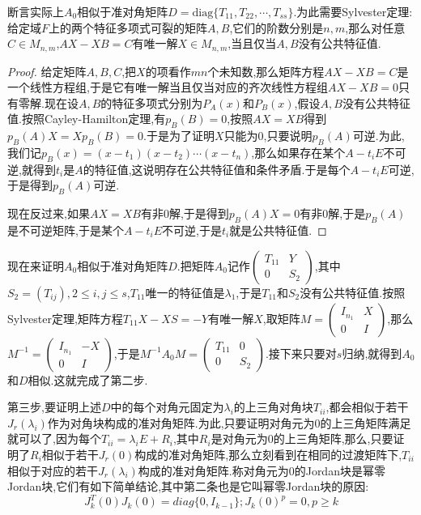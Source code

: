 断言实际上$A_0$相似于准对角矩阵$D=\mathrm{diag}\{T_{11},T_{22},\cdots,T_{ss}\}$.为此需要Sylvester定理:给定域$F$上的两个特征多项式可裂的矩阵$A,B$,它们的阶数分别是$n,m$,那么对任意$C\in M_{n,m}$,$AX-XB=C$有唯一解$X\in M_{n,m}$,当且仅当$A,B$没有公共特征值.

\begin{proof}
	
	给定矩阵$A,B,C$,把$X$的项看作$mn$个未知数,那么矩阵方程$AX-XB=C$是一个线性方程组,于是它有唯一解当且仅当对应的齐次线性方程组$AX-XB=0$只有零解.现在设$A,B$的特征多项式分别为$P_A(x)$和$P_B(x)$,假设$A,B$没有公共特征值.按照Cayley-Hamilton定理,有$p_B(B)=0$,按照$AX=XB$得到$p_B(A)X=Xp_B(B)=0$.于是为了证明$X$只能为0,只要说明$p_B(A)$可逆.为此,我们记$p_B(x)=(x-t_1)(x-t_2)\cdots(x-t_n)$,那么如果存在某个$A-t_iE$不可逆,就得到$t_i$是$A$的特征值,这说明存在公共特征值和条件矛盾.于是每个$A-t_iE$可逆,于是得到$p_B(A)$可逆.
	
	现在反过来,如果$AX=XB$有非0解,于是得到$p_B(A)X=0$有非0解,于是$p_B(A)$是不可逆矩阵,于是某个$A-t_iE$不可逆,于是$t_i$就是公共特征值.
	
\end{proof}

现在来证明$A_0$相似于准对角矩阵$D$.把矩阵$A_0$记作$\left(\begin{array}{cc}
T_{11}&Y\\
0&S_2\end{array}\right)$,其中$S_2=(T_{ij}),2\le i,j\le s$,$T_{11}$唯一的特征值是$\lambda_1$,于是$T_{11}$和$S_2$没有公共特征值.按照Sylvester定理,矩阵方程$T_{11}X-XS=-Y$有唯一解$X$,取矩阵$M=\left(\begin{array}{cc}
I_{n_1}&X\\
0&I\end{array}\right)$,那么$M^{-1}=\left(\begin{array}{cc}
I_{n_1}&-X\\
0&I\end{array}\right)$,于是$M^{-1}A_0M=\left(\begin{array}{cc}
T_{11}&0\\
0&S_2\end{array}\right)$.接下来只要对$s$归纳,就得到$A_0$和$D$相似.这就完成了第二步.

第三步,要证明上述$D$中的每个对角元固定为$\lambda_i$的上三角对角块$T_{ii}$,都会相似于若干$J_r(\lambda_i)$作为对角块构成的准对角矩阵.为此,只要证明对角元为0的上三角矩阵满足就可以了,因为每个$T_{ii}=\lambda_i E+R_i$,其中$R_i$是对角元为0的上三角矩阵,那么,只要证明了$R_i$相似于若干$J_r(0)$构成的准对角矩阵,那么立刻看到在相同的过渡矩阵下,$T_{ii}$相似于对应的若干$J_r(\lambda_i)$构成的准对角矩阵.称对角元为0的Jordan块是幂零Jordan块,它们有如下简单结论,其中第二条也是它叫幂零Jordan块的原因:
$$J_k^T(0)J_k(0)=diag\{0,I_{k-1}\};J_k(0)^p=0,p\ge k$$

